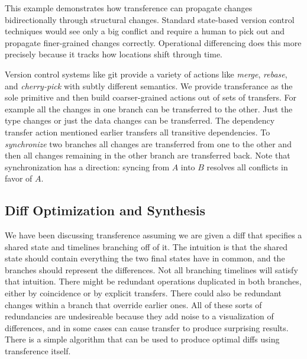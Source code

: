\documentclass[english,submission]{programming}
\theoremstyle{definition}
\begin{document}
This example demonstrates how transference can propagate changes bidirectionally through structural changes. Standard state-based version control techniques would see only a big conflict and require a human to pick out and propagate finer-grained changes correctly.
Operational differencing does this more precisely because it tracks how locations shift through time.

Version control systems like git provide a variety of actions like \textit{merge}, \textit{rebase}, and \textit{cherry-pick} with subtly different semantics. We provide transferance as the sole primitive and then build coarser-grained actions out of sets of transfers. For example all the changes in one branch can be transferred to the other. Just the type changes or just the data changes can be transferred. The dependency transfer action mentioned earlier transfers all transitive dependencies. To \textit{synchronize} two branches all changes are transferred from one to the other and then all changes remaining in the other branch are transferred back. Note that synchronization has a direction: syncing from $A$ into $B$ resolves all conflicts in favor of $A$.


\subsection{Diff Optimization and Synthesis}\label{diff-synth}

We have been discussing transference assuming we are given a diff that specifies a shared state and timelines branching off of it. The intuition is that the shared state should contain everything the two final states have in common, and the branches should represent the differences. Not all branching timelines will satisfy that intuition. There might be redundant operations duplicated in both branches, either by coincidence or by explicit transfers. There could also be redundant changes within a branch that override earlier ones. All of these sorts of redundancies are undesireable because they add noise to a visualization of differences, and in some cases can cause transfer to produce surprising results. There is a simple algorithm that can be used to produce optimal diffs using transference itself.
\end{document}
